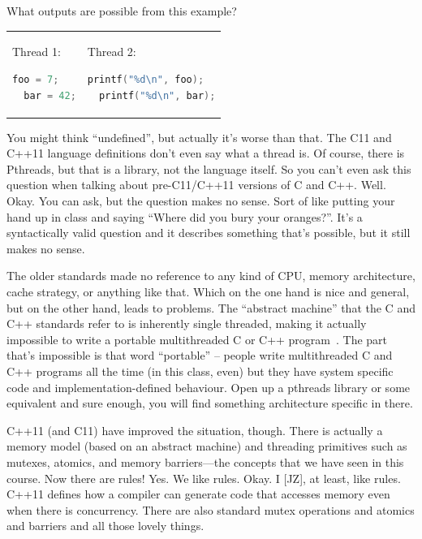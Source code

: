 \documentclass[a4paper]{report}
\begin{document}
What outputs are possible from this example?

\begin{tabular}{ll}
      \begin{minipage}{.2\textwidth}
        Thread 1:
        \begin{lstlisting}[language=C]
  foo = 7;
  bar = 42;
        \end{lstlisting}
      \end{minipage} &
      \begin{minipage}{.4\textwidth}
        Thread 2:
        \begin{lstlisting}[language=C]
  printf("%d\n", foo);
  printf("%d\n", bar);
        \end{lstlisting}
      \end{minipage}
\end{tabular}

You might think ``undefined'', but actually it's worse than that. The 
C11 and C++11 language definitions don't even say what a thread is.
Of course, there is Pthreads, but that is a library, not the language itself.
So you can't even ask this question when talking about pre-C11/C++11 versions
of C and C++. Well. Okay. You can ask, but the question makes no sense. Sort of like
putting your hand up in class and saying ``Where did you bury your oranges?''.
It's a syntactically valid question and it describes something that's possible,
but it still makes no sense.

The older standards made no reference to any kind of CPU, memory architecture, cache
strategy, or anything like that. Which on the one hand is nice and general, but on the other hand, leads to problems. The ``abstract machine'' that the C and C++ standards refer to is inherently single threaded, making it actually impossible to write a portable multithreaded C or C++ program~\cite{quora:cppthr}. The part that's impossible is that word ``portable'' -- people write multithreaded C and C++ programs all the time (in this class, even) but they have system specific code and implementation-defined behaviour. Open up a pthreads library or some equivalent and sure enough, you will find something architecture specific in there.

C++11 (and C11) have improved the situation, though. There is actually
a memory model (based on an abstract machine) and threading primitives
such as mutexes, atomics, and memory barriers---the concepts that we
have seen in this course. Now there are rules! Yes. We like rules. Okay. I [JZ], at least, like rules. C++11 defines how a compiler can generate code that accesses memory even when there is concurrency. There are also standard mutex operations and atomics and barriers and all those lovely things.
\end{document}
